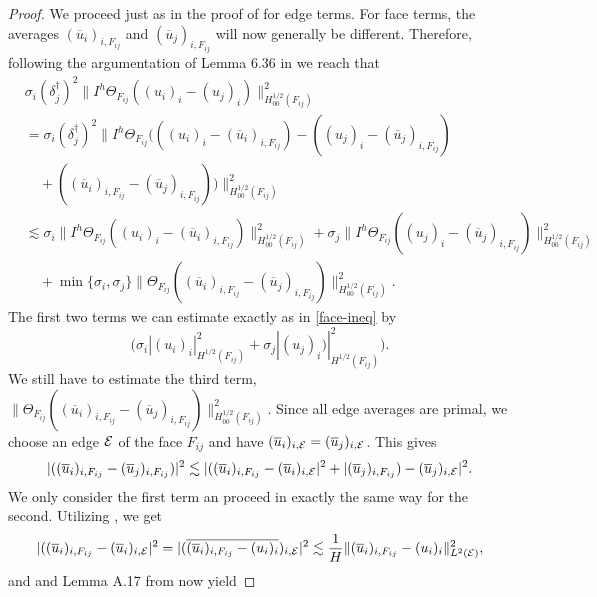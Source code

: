\begin{proof}
    We proceed just as in the proof of  for edge terms. For face terms, the averages $(\overline u_i)_{i, F_{ij}}$ and $(\overline u_j)_{i, F_{ij}}$ will now generally be different. Therefore, following the argumentation of Lemma 6.36 in \cite{dd-book} we reach that
    \begin{equation}
    \label{face-ineq-no-av}
        \begin{split}
            & \sigma_i (\delta_j^{\dag})^2 \|I^h\Theta_{F_{ij}}((u_i)_i - (u_j)_i)\|_{H_{00}^{1 / 2}(F_{ij})}^2 \\
            & = \sigma_i (\delta_j^{\dag})^2 \|I^h\Theta_{F_{ij}}(((u_i)_i - (\overline u_i)_{i, F_{ij}}) - ((u_j)_i - (\overline u_j)_{i, F_{ij}}) \\
            & \quad + ((\overline u_i)_{i, F_{ij}} - (\overline u_j)_{i, F_{ij}}))\|_{H_{00}^{1 / 2}(F_{ij})}^2 \\
            & \lesssim \sigma_i \|I^h\Theta_{F_{ij}}((u_i)_i - (\overline u_i)_{i, F_{ij}})\|_{H_{00}^{1 / 2}(F_{ij})}^2 + \sigma_j \|I^h\Theta_{F_{ij}}((u_j)_i - (\overline u_j)_{i, F_{ij}})\|_{H_{00}^{1 / 2}(F_{ij})}^2 \\
            & \quad + \min\{\sigma_i, \sigma_j\} \|\Theta_{F_{ij}} ((\overline u_i)_{i, F_{ij}} - (\overline u_j)_{i, F_{ij}})\|^2_{H^{1/2}_{00}(F_{ij})}.
        \end{split}
    \end{equation}
    The first two terms we can estimate exactly as in \ref{face-ineq} by
    \[\big(\sigma_i |(u_i)_i|_{H^{1 / 2}(F_{ij})}^2 + \sigma_j |(u_j)_i)|_{H^{1 / 2}(F_{ij})}^2 \big).\]
    We still have to estimate the third term, $\|\Theta_{F_{ij}} ((\overline u_i)_{i, F_{ij}} - (\overline u_j)_{i, F_{ij}})\|^2_{H^{1/2}_{00}(F_{ij})}$. Since all edge averages are primal, we choose an edge $\mathcal{E}$ of the face $F_{ij}$ and have $(\overline{u}_i)_{i, \mathcal{E}} = (\overline{u}_j)_{i, \mathcal{E}}$. This gives
    \[|((\overline u_i)_{i, F_{ij}} - (\overline u_j)_{i, F_{ij}})|^2 \lesssim |((\overline u_i)_{i, F_{ij}} - (\overline{u}_i)_{i, \mathcal{E}}|^2 + |(\overline u_j)_{i, F_{ij}}) - (\overline{u}_j)_{i, \mathcal{E}}|^2.\]
    We only consider the first term an proceed in exactly the same way for the second. Utilizing , we get
    \[|((\overline u_i)_{i, F_{ij}} - (\overline{u}_i)_{i, \mathcal{E}}|^2 = |(\overline{(\overline u_i)_{i, F_{ij}} - (u_i)_i})_{i, \mathcal{E}}|^2 \lesssim \frac{1}{H}\|(\overline u_i)_{i, F_{ij}} - (u_i)_i\|^2_{L^2(\mathcal{E})}, \]
    and  and Lemma A.17 from \cite{dd-book} now yield

\end{proof}
